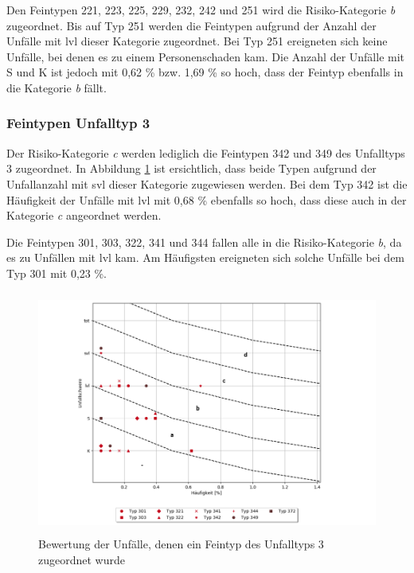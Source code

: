 Den Feintypen 221, 223, 225, 229, 232, 242 und 251 wird die Risiko-Kategorie \textit{b} zugeordnet. Bis auf Typ 251 werden die Feintypen aufgrund der Anzahl der Unfälle mit \ac{lvl} dieser Kategorie zugeordnet. Bei Typ 251 ereigneten sich keine Unfälle, bei denen es zu einem Personenschaden kam. Die Anzahl der Unfälle mit \ac{S} und \ac{K} ist jedoch mit 0,62 \% bzw. 1,69 \% so hoch, dass der Feintyp ebenfalls in die Kategorie \textit{b} fällt.

\subsubsection{Feintypen Unfalltyp 3}
Der Risiko-Kategorie \textit{c} werden lediglich die Feintypen 342 und 349 des Unfalltyps 3 zugeordnet. In Abbildung \ref{fig:Bewertung_FT3} ist ersichtlich, dass beide Typen aufgrund der Unfallanzahl mit \ac{svl} dieser Kategorie zugewiesen werden. Bei dem Typ 342 ist die Häufigkeit der Unfälle mit \ac{lvl} mit 0,68 \% ebenfalls so hoch, dass diese auch in der Kategorie \textit{c} angeordnet werden.

Die Feintypen 301, 303, 322, 341 und 344 fallen alle in die Risiko-Kategorie \textit{b}, da es zu Unfällen mit \ac{lvl} kam. Am Häufigsten ereigneten sich solche Unfälle bei dem Typ 301 mit 0,23 \%.

\begin{savenotes}
	\begin{figure}[H]
		\centering
		\includegraphics[width=12cm,height=8cm]{figures/Bewertung_FT3}
		\caption[Bewertung der Unfälle, denen ein Feintyp des Unfalltyps 3 zugeordnet wurde]{Bewertung der Unfälle, denen ein Feintyp des Unfalltyps 3 zugeordnet wurde}\label{fig:Bewertung_FT3}
	\end{figure}
\end{savenotes}

